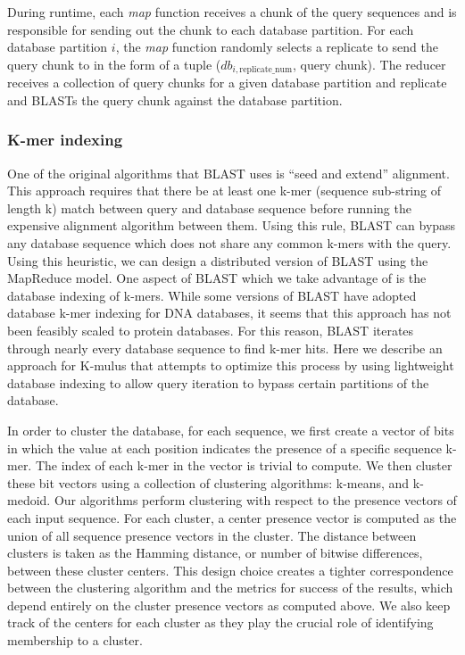 \documentclass[12pt,\mydriver]{thesis}
\begin{document}
During runtime, each \emph{map} function receives a chunk of the query sequences and is responsible for sending out the chunk to each database partition.
For each database partition $i$, the \emph{map} function randomly selects a replicate to send the query chunk to in the form of a tuple ($db_{i,\text{replicate\_num}}$, query chunk).
The reducer receives a collection of query chunks for a given database partition and replicate and BLASTs the query chunk against the database partition.

\subsubsection{K-mer indexing}
One of the original algorithms that BLAST uses is ``seed and extend'' alignment. This approach requires that there be at least one k-mer (sequence sub-string of length k) match between query and database sequence before running the expensive alignment algorithm between them\cite{altschul1990basic}. Using this rule, BLAST can bypass any database sequence which does not share any common k-mers with the query. Using this heuristic, we can design a distributed version of BLAST using the MapReduce model. One aspect of BLAST which we take advantage of is the database indexing of k-mers. While some versions of BLAST have adopted database k-mer indexing for DNA databases, it seems that this approach has not been feasibly scaled to protein databases\cite{morgulis2008database}. For this reason, BLAST iterates through nearly every database sequence to find k-mer hits. Here we describe an approach for K-mulus that attempts to optimize this process by using lightweight database indexing to allow query iteration to bypass certain partitions of the database.

In order to cluster the database, for each sequence, we first create a vector of bits in which the value at each position indicates the presence of a specific sequence k-mer. The index of each k-mer in the vector is trivial to compute.
We then cluster these bit vectors using a collection of clustering algorithms: k-means\cite{hartigan1979algorithm}, and k-medoid\cite{van2003new}.
Our algorithms perform clustering with respect to the presence vectors of each input sequence. For each cluster, a center presence vector is computed as the union of all sequence presence vectors in the cluster. The distance between clusters is taken as the Hamming distance, or number of bitwise differences, between these cluster centers. This design choice creates a tighter correspondence between the clustering algorithm and the metrics for success of the results, which depend entirely on the cluster presence vectors as computed above.
We also keep track of the centers for each cluster as they play the crucial role of identifying membership to a cluster.
\end{document}
